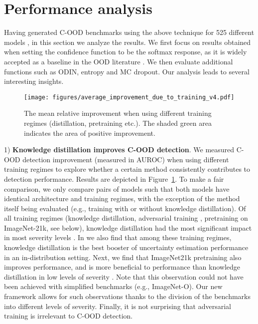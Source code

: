 \documentclass[table]{article} \usepackage{PRIMEarxiv}
\begin{document}
\section{Performance analysis}
\label{sec:analysis}
Having generated C-OOD benchmarks using the above technique for 525 different models
, in this section we analyze the results.
We first focus on results obtained when setting the confidence function  to be the softmax response, as it is widely accepted as a baseline in the OOD literature \citep{DBLP:conf/iclr/HendrycksG17, DBLP:conf/miccai/BergerPGK21}.
 We then evaluate additional  functions such as ODIN, entropy and MC dropout.
Our analysis leads to several interesting insights.

\begin{figure}[h]
    \centering
\texttt{[image: figures/average\_improvement\_due\_to\_training\_v4.pdf]}
    \caption{The mean relative improvement when using different training regimes (distillation, pretraining etc.). The shaded green area indicates the area of positive improvement.}
    \label{fig:relative_imrovement_training}
\end{figure}
1) \textbf{Knowledge distillation improves C-OOD detection}.
We measured C-OOD detection improvement (measured in AUROC) when using different training regimes to explore whether a certain method consistently contributes to detection performance. Results are depicted in Figure~\ref{fig:relative_imrovement_training}.
To make a fair comparison, we only compare pairs of models such that both models have identical architecture and training regimes, with the exception of the method itself being evaluated (e.g., training with or without knowledge distillation). Of all training regimes (knowledge distillation, adversarial training \citep{DBLP:journals/corr/GoodfellowSS14}, pretraining on ImageNet-21k, see below),
knowledge distillation had the most significant impact in most severity levels .
In \citet{galil2023what} we also find that among these training regimes, knowledge distillation is the best booster of uncertainty estimation performance in an in-distribution setting.
Next, we find that ImageNet21k pretraining also improves performance, and is more beneficial to performance than knowledge distillation in low levels of severity . 
Note that this observation could not have been achieved with simplified benchmarks (e.g., ImageNet-O). Our new framework allows for such observations thanks to the division of the benchmarks into different levels of severity.
Finally, 
it is not surprising that adversarial training is irrelevant to C-OOD detection.
\end{document}
